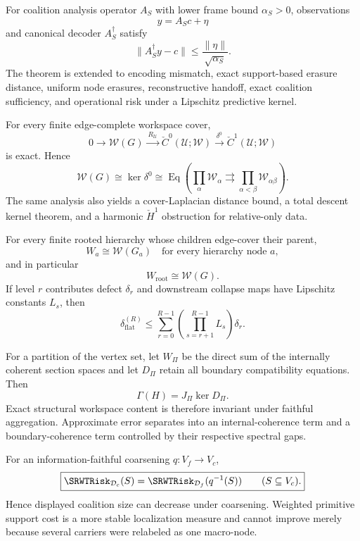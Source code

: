 
For coalition analysis operator \(A_S\) with lower frame bound
\(\alpha_S>0\), observations
\[
y=A_Sc+\eta
\]
and canonical decoder \(A_S^\dagger\) satisfy
\[
\boxed{
\|A_S^\dagger y-c\|
\leq
\frac{\|\eta\|}{\sqrt{\alpha_S}}.
}
\]
The theorem is extended to encoding mismatch, exact support-based erasure
distance, uniform node erasures, reconstructive handoff, exact coalition
sufficiency, and operational risk under a Lipschitz predictive kernel.


For every finite edge-complete workspace cover,
\[
\boxed{
0
\longrightarrow
\mathscr W(G)
\xrightarrow{\ R_{\mathcal U}\ }
\check C^0(\mathcal U;\mathscr W)
\xrightarrow{\ \delta^0\ }
\check C^1(\mathcal U;\mathscr W)
}
\]
is exact. Hence
\[
\boxed{
\mathscr W(G)
\cong
\ker\delta^0
\cong
\operatorname{Eq}
\left(
\prod_\alpha\mathscr W_\alpha
\rightrightarrows
\prod_{\alpha<\beta}\mathscr W_{\alpha\beta}
\right).
}
\]
The same analysis also yields a cover-Laplacian distance bound, a total descent kernel
theorem, and a harmonic \(\check H^1\) obstruction for relative-only data.


For every finite rooted hierarchy whose children edge-cover their parent,
\[
\boxed{
W_a\cong\mathscr W(G_a)
\quad\text{for every hierarchy node }a,
}
\]
and in particular
\[
\boxed{W_{\mathrm{root}}\cong\mathscr W(G).}
\]
If level \(r\) contributes defect \(\delta_r\) and downstream collapse maps
have Lipschitz constants \(L_s\), then
\[
\boxed{
\delta_{\mathrm{flat}}^{(R)}
\leq
\sum_{r=0}^{R-1}
\left(
\prod_{s=r+1}^{R-1}L_s
\right)\delta_r.
}
\]



For a partition of the vertex set, let \(W_\Pi\) be the direct sum of the
internally coherent section spaces and let \(D_\Pi\) retain all boundary
compatibility equations. Then
\[
\boxed{
\Gamma(H)
=
J_\Pi\ker D_\Pi.
}
\]
Exact structural workspace content is therefore invariant under faithful
aggregation. Approximate error separates into an internal-coherence term and
a boundary-coherence term controlled by their respective spectral gaps.


For an information-faithful coarsening \(q:V_f\to V_c\),
\[
\boxed{
\SRWTRisk_{\mathcal D_c}(S)
=
\SRWTRisk_{\mathcal D_f}(q^{-1}(S))
\qquad(S\subseteq V_c).
}
\]
Hence displayed coalition size can decrease under coarsening. Weighted
primitive support cost is a more stable localization measure and cannot
improve merely because several carriers were relabeled as one macro-node.

